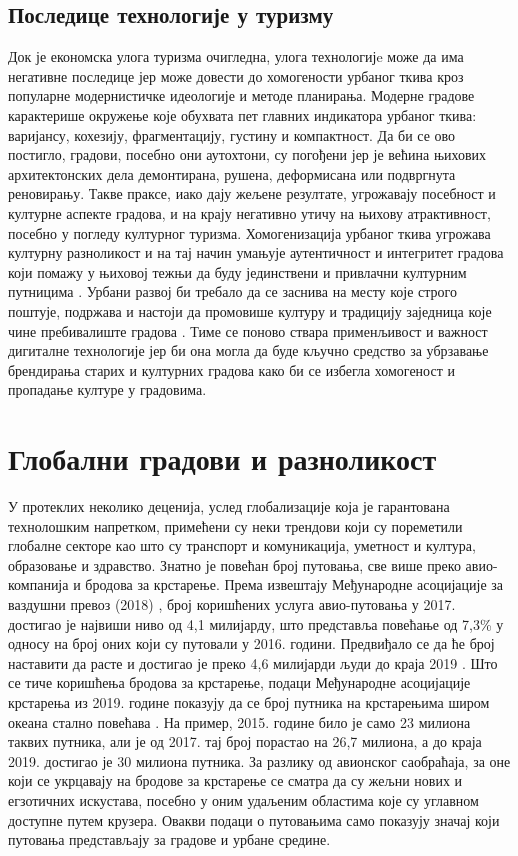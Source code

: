 \documentclass{article}
\begin{document}
\subsection{Последице технологије у туризму}
Док је економска улога туризма очигледна, улога технологијe може да има негативне последице јер може довести до хомогености урбаног ткива кроз популарне модернистичке идеологије и методе планирања. Модерне градове карактерише окружење које обухвата пет главних индикатора урбаног ткива: варијансу, кохезију, фрагментацију, густину и компактност. Да би се ово постигло, градови, посебно они аутохтони, су погођени јер је већина њихових архитектонских дела демонтирана, рушена, деформисана или подвргнута реновирању. Такве праксе, иако дају жељене резултате, угрожавају посебност и културне аспекте градова, и на крају негативно утичу на њихову атрактивност, посебно у погледу културног туризма. Хомогенизација урбаног ткива угрожава културну разноликост и на тај начин умањује аутентичност и интегритет градова који помажу у њиховој тежњи да буду јединствени и привлачни културним путницима \cite{meyer}. Урбани развој би требало да се заснива на месту које строго поштује, подржава и настоји да промовише културу и традицију заједница које чине пребивалиште градова \cite{unhabitat3}. Тиме се поново ствара применљивост и важност дигиталне технологије јер би она могла да буде кључно средство за убрзавање брендирања старих и културних градова како би се избегла хомогеност и пропадање културе у градовима.

\section{Глобални градови и разноликост}

У протеклих неколико деценија, услед глобализације која је гарантована технолошким напретком, примећени су неки трендови који су пореметили глобалне секторе као што су транспорт и комуникација, уметност и култура, образовање и здравство. Знатно је повећан број путовања, све више преко авио-компанија и бродова за крстарење. Према извештају Међународне асоцијације за ваздушни превоз (2018) \cite{avioni}, број коришћених услуга авио-путовања у 2017. достигао је највиши ниво од 4,1 милијарду, што представља повећање од 7,3\% у односу на број оних који су путовали у 2016. години. Предвиђало се да ће број наставити да расте и достигао је преко 4,6 милијарди људи до краја 2019 \cite{mazarenau}. Што се тиче коришћења бродова за крстарење, подаци Међународне асоцијације крстарења из 2019. године показују да се број путника на крстарењима широм океана стално повећава \cite{kennedy}. На пример, 2015. године било је само 23 милиона таквих путника, али је од 2017. тај број порастао на 26,7 милиона, а до краја 2019. достигао је 30 милиона путника. За разлику од авионског саобраћаја, за оне који се укрцавају на бродове за крстарење се сматра да су жељни нових и егзотичних искустава, посебно у оним удаљеним областима које су углавном доступне путем крузера. Овакви подаци о путовањима само показују значај који путовања представљају за градове и урбане средине.
\end{document}
